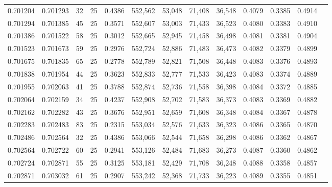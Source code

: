 \begin{tabular}{rrrrrrrrrrrrr}
0.701204 & 0.701293 &    32 &  25 &                                     0.4386 & 552,562 &  53,048 &  71,408 &  36,548 & 0.4079 & 0.3385 & 0.4914 \\
0.701294 & 0.701385 &    45 &  25 &                                     0.3571 & 552,607 &  53,003 &  71,433 &  36,523 & 0.4080 & 0.3383 & 0.4910 \\
0.701386 & 0.701522 &    58 &  25 &                                     0.3012 & 552,665 &  52,945 &  71,458 &  36,498 & 0.4081 & 0.3381 & 0.4904 \\
0.701523 & 0.701673 &    59 &  25 &                                     0.2976 & 552,724 &  52,886 &  71,483 &  36,473 & 0.4082 & 0.3379 & 0.4899 \\
0.701675 & 0.701835 &    65 &  25 &                                     0.2778 & 552,789 &  52,821 &  71,508 &  36,448 & 0.4083 & 0.3376 & 0.4893 \\
0.701838 & 0.701954 &    44 &  25 &                                     0.3623 & 552,833 &  52,777 &  71,533 &  36,423 & 0.4083 & 0.3374 & 0.4889 \\
0.701955 & 0.702063 &    41 &  25 &                                     0.3788 & 552,874 &  52,736 &  71,558 &  36,398 & 0.4084 & 0.3372 & 0.4885 \\
0.702064 & 0.702159 &    34 &  25 &                                     0.4237 & 552,908 &  52,702 &  71,583 &  36,373 & 0.4083 & 0.3369 & 0.4882 \\
0.702162 & 0.702282 &    43 &  25 &                                     0.3676 & 552,951 &  52,659 &  71,608 &  36,348 & 0.4084 & 0.3367 & 0.4878 \\
0.702283 & 0.702483 &    83 &  25 &                                     0.2315 & 553,034 &  52,576 &  71,633 &  36,323 & 0.4086 & 0.3365 & 0.4870 \\
0.702486 & 0.702564 &    32 &  25 &                                     0.4386 & 553,066 &  52,544 &  71,658 &  36,298 & 0.4086 & 0.3362 & 0.4867 \\
0.702564 & 0.702722 &    60 &  25 &                                     0.2941 & 553,126 &  52,484 &  71,683 &  36,273 & 0.4087 & 0.3360 & 0.4862 \\
0.702724 & 0.702871 &    55 &  25 &                                     0.3125 & 553,181 &  52,429 &  71,708 &  36,248 & 0.4088 & 0.3358 & 0.4857 \\
0.702871 & 0.703032 &    61 &  25 &                                     0.2907 & 553,242 &  52,368 &  71,733 &  36,223 & 0.4089 & 0.3355 & 0.4851 \\

\end{tabular}
